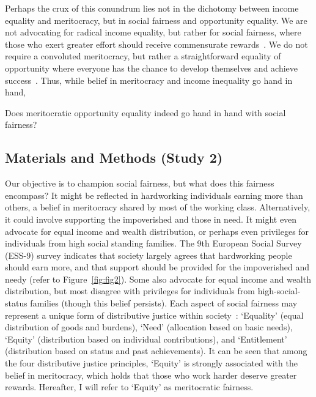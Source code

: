Perhaps the crux of this conundrum lies not in the dichotomy between income equality and meritocracy, but in social fairness and opportunity equality. We are not advocating for radical income equality, but rather for social fairness, where those who exert greater effort should receive commensurate rewards~\citep{starmans2017people}. We do not require a convoluted meritocracy, but rather a straightforward equality of opportunity where everyone has the chance to develop themselves and achieve success~\citep{swift1997meritocratic}. Thus, while belief in meritocracy and income inequality go hand in hand,

\begin{question}
	Does meritocratic opportunity equality indeed go hand in hand with social fairness?
\end{question}

\subsection{Materials and Methods (Study 2)}
Our objective is to champion social fairness, but what does this fairness encompass? It might be reflected in hardworking individuals earning more than others, a belief in meritocracy shared by most of the working class. Alternatively, it could involve supporting the impoverished and those in need. It might even advocate for equal income and wealth distribution, or perhaps even privileges for individuals from high social standing families. The 9th European Social Survey (ESS-9) survey indicates that society largely agrees that hardworking people should earn more, and that support should be provided for the impoverished and needy (refer to Figure~\ref{fig:fig2}). Some also advocate for equal income and wealth distribution, but most disagree with privileges for individuals from high-social-status families (though this belief persists). Each aspect of social fairness may represent a unique form of distributive justice within society~\citep{hulle2018measuring}: ‘Equality’ (equal distribution of goods and burdens), ‘Need’ (allocation based on basic needs), ‘Equity’ (distribution based on individual contributions), and ‘Entitlement’ (distribution based on status and past achievements). It can be seen that among the four distributive justice principles, ‘Equity’ is strongly associated with the belief in meritocracy, which holds that those who work harder deserve greater rewards. Hereafter, I will refer to ‘Equity’ as meritocratic fairness.

